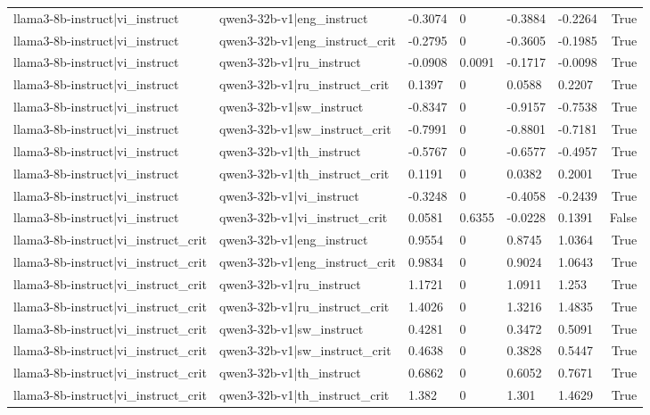 \begin{table}
\begin{tabular}{llllllr}
llama3-8b-instruct|vi_instruct & qwen3-32b-v1|eng_instruct & -0.3074 & 0 & -0.3884 & -0.2264 & True \\
llama3-8b-instruct|vi_instruct & qwen3-32b-v1|eng_instruct_crit & -0.2795 & 0 & -0.3605 & -0.1985 & True \\
llama3-8b-instruct|vi_instruct & qwen3-32b-v1|ru_instruct & -0.0908 & 0.0091 & -0.1717 & -0.0098 & True \\
llama3-8b-instruct|vi_instruct & qwen3-32b-v1|ru_instruct_crit & 0.1397 & 0 & 0.0588 & 0.2207 & True \\
llama3-8b-instruct|vi_instruct & qwen3-32b-v1|sw_instruct & -0.8347 & 0 & -0.9157 & -0.7538 & True \\
llama3-8b-instruct|vi_instruct & qwen3-32b-v1|sw_instruct_crit & -0.7991 & 0 & -0.8801 & -0.7181 & True \\
llama3-8b-instruct|vi_instruct & qwen3-32b-v1|th_instruct & -0.5767 & 0 & -0.6577 & -0.4957 & True \\
llama3-8b-instruct|vi_instruct & qwen3-32b-v1|th_instruct_crit & 0.1191 & 0 & 0.0382 & 0.2001 & True \\
llama3-8b-instruct|vi_instruct & qwen3-32b-v1|vi_instruct & -0.3248 & 0 & -0.4058 & -0.2439 & True \\
llama3-8b-instruct|vi_instruct & qwen3-32b-v1|vi_instruct_crit & 0.0581 & 0.6355 & -0.0228 & 0.1391 & False \\
llama3-8b-instruct|vi_instruct_crit & qwen3-32b-v1|eng_instruct & 0.9554 & 0 & 0.8745 & 1.0364 & True \\
llama3-8b-instruct|vi_instruct_crit & qwen3-32b-v1|eng_instruct_crit & 0.9834 & 0 & 0.9024 & 1.0643 & True \\
llama3-8b-instruct|vi_instruct_crit & qwen3-32b-v1|ru_instruct & 1.1721 & 0 & 1.0911 & 1.253 & True \\
llama3-8b-instruct|vi_instruct_crit & qwen3-32b-v1|ru_instruct_crit & 1.4026 & 0 & 1.3216 & 1.4835 & True \\
llama3-8b-instruct|vi_instruct_crit & qwen3-32b-v1|sw_instruct & 0.4281 & 0 & 0.3472 & 0.5091 & True \\
llama3-8b-instruct|vi_instruct_crit & qwen3-32b-v1|sw_instruct_crit & 0.4638 & 0 & 0.3828 & 0.5447 & True \\
llama3-8b-instruct|vi_instruct_crit & qwen3-32b-v1|th_instruct & 0.6862 & 0 & 0.6052 & 0.7671 & True \\
llama3-8b-instruct|vi_instruct_crit & qwen3-32b-v1|th_instruct_crit & 1.382 & 0 & 1.301 & 1.4629 & True \\

\end{tabular}
\end{table}
